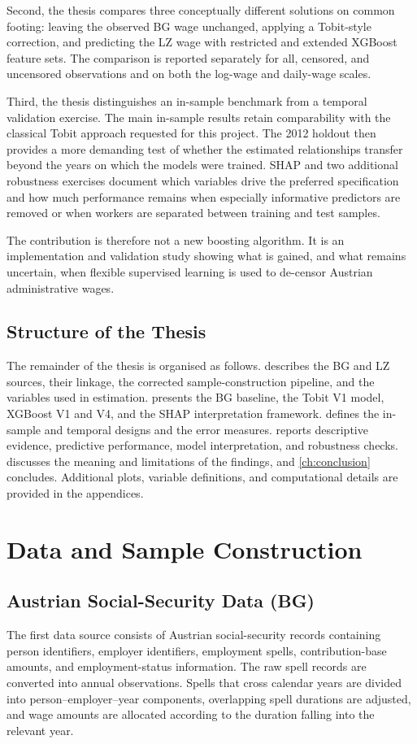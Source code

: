 \documentclass[12pt,a4paper,oneside,titlepage]{book}
\begin{document}
Second, the thesis compares three conceptually different solutions on common footing: leaving the observed BG wage unchanged, applying a Tobit-style correction, and predicting the LZ wage with restricted and extended XGBoost feature sets. The comparison is reported separately for all, censored, and uncensored observations and on both the log-wage and daily-wage scales.

Third, the thesis distinguishes an in-sample benchmark from a temporal validation exercise. The main in-sample results retain comparability with the classical Tobit approach requested for this project. The 2012 holdout then provides a more demanding test of whether the estimated relationships transfer beyond the years on which the models were trained. SHAP and two additional robustness exercises document which variables drive the preferred specification and how much performance remains when especially informative predictors are removed or when workers are separated between training and test samples.

The contribution is therefore not a new boosting algorithm. It is an implementation and validation study showing what is gained, and what remains uncertain, when flexible supervised learning is used to de-censor Austrian administrative wages.

\section{Structure of the Thesis}
The remainder of the thesis is organised as follows.  describes the BG and LZ sources, their linkage, the corrected sample-construction pipeline, and the variables used in estimation.  presents the BG baseline, the Tobit V1 model, XGBoost V1 and V4, and the SHAP interpretation framework.  defines the in-sample and temporal designs and the error measures.  reports descriptive evidence, predictive performance, model interpretation, and robustness checks.  discusses the meaning and limitations of the findings, and \cref{ch:conclusion} concludes. Additional plots, variable definitions, and computational details are provided in the appendices.

\chapter{Data and Sample Construction}
\label{ch:data}

\section{Austrian Social-Security Data (BG)}
The first data source consists of Austrian social-security records containing person identifiers, employer identifiers, employment spells, contribution-base amounts, and employment-status information. The raw spell records are converted into annual observations. Spells that cross calendar years are divided into person--employer--year components, overlapping spell durations are adjusted, and wage amounts are allocated according to the duration falling into the relevant year.
\end{document}
